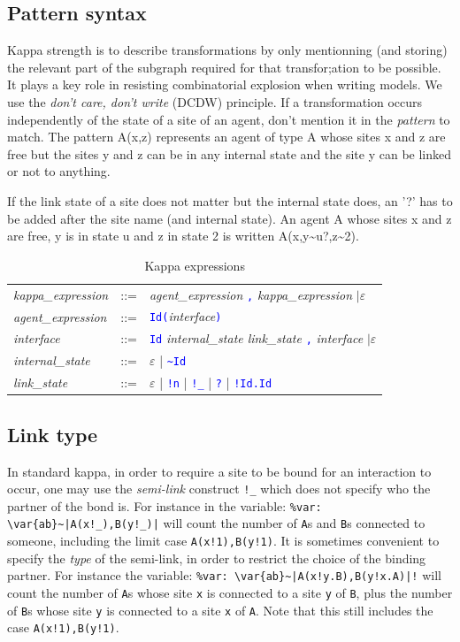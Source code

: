 \documentclass[11pt]{book}
\def\intstate{\textasciitilde}
\def\tcb#1{\textcolor{blue}{\ttt{#1}}}
\def\ttt#1{\texttt{#1}}
\def\var#1{{\textquotesingle}#1{\textquotesingle}}
\begin{document}
\subsection{Pattern syntax}
Kappa strength is to describe transformations by only mentionning (and
storing) the relevant part of the subgraph required for that
transfor;ation to be possible. It plays a key role in resisting
combinatorial explosion when writing models. We use the \emph{don't
  care, don't write} (DCDW) principle. If a
transformation occurs independently of the state of a site of an
agent, don't mention it in the \emph{pattern} to match. The pattern
A(x,z) represents an agent of type A whose sites x and z are free but
the sites y and z can be in any internal state and the site y can be
linked or not to anything.

If the link state of a site does not matter but the internal state
does, an '?' has to be added after the site name (and internal state).
An agent A whose sites x and z are free, y is in state u and z in
state 2 is written A(x,y\intstate{}u?,z\intstate{}2).

\begin{table}[ht!]
  \centering
  \caption{Kappa expressions}
  \begin{tabular}{@{} lcl @{}}
    \textit{kappa\_expression} & ::= & \textit{agent\_expression} \tcb{,} \textit{kappa\_expression} $\mid\varepsilon$ \\
    \textit{agent\_expression} & ::= &  \tcb{Id}\tcb{(}\textit{interface}\tcb{)} \\
    \textit{interface} &::=& \tcb{Id} \textit{internal\_state link\_state}  \tcb{,} \textit{interface} $\mid\varepsilon$ \\
    \textit{internal\_state} &::=& $\varepsilon$ | \tcb{\intstate Id} \\
    \textit{link\_state} &::=& $\varepsilon$ | \tcb{!n} | \tcb{!\_} | \tcb{?}  | \tcb{!Id.Id} \\
    \end{tabular}
  \label{tab:patterns}
\end{table}

\subsection{Link type}

In standard kappa, in order to require a site to be bound for an
interaction to occur, one may use the
\emph{semi-link} construct \ttt{!\_} which does not
specify who the partner of the bond is. For instance in the variable:
\lstinline[language=kappa]*%var: \var{ab}~|A(x!_),B(y!_)|* will
count the number of \ttt{A}s and \ttt{B}s connected to someone,
including the limit case \ttt{A(x!1),B(y!1)}. It is sometimes
convenient to specify the \emph{type} of the
semi-link, in order to restrict the choice of the binding partner. For
instance the variable:
\lstinline[language=kappa]*%var: \var{ab}~|A(x!y.B),B(y!x.A)|!*
will count the number of \ttt{A}s whose
site \ttt{x} is connected to a site \ttt{y} of \ttt{B}, plus the
number of \ttt{B}s whose site \ttt{y} is connected to a site \ttt{x}
of \ttt{A}. Note that this still includes the case
\ttt{A(x!1),B(y!1)}.
\end{document}
